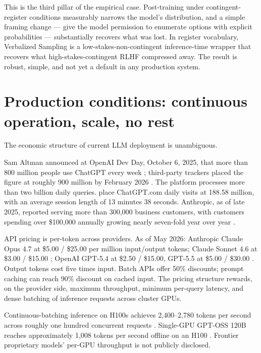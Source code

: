 \documentclass[11pt]{article}
\begin{document}
This is the third pillar of the empirical case. Post-training under
contingent-register conditions measurably narrows the model's
distribution, and a simple framing change --- give the model permission
to enumerate options with explicit probabilities --- substantially
recovers what was lost. In register vocabulary, Verbalized Sampling is
a low-stakes-non-contingent inference-time wrapper that recovers what
high-stakes-contingent RLHF compressed away. The result is robust,
simple, and not yet a default in any production system.

\section{Production conditions: continuous operation, scale, no rest}

The economic structure of current LLM deployment is unambiguous.

Sam Altman announced at OpenAI Dev Day, October 6, 2025, that more
than 800 million people use ChatGPT every week
\cite{techcrunch2025_800m}; third-party trackers placed the figure at
roughly 900 million by February 2026 \cite{demandsage2026_chatgpt}.
The platform processes more than two billion daily queries.
\cite{digitalinfoworld2025_chatgpt} place ChatGPT.com daily visits at
188.58 million, with an average session length of 13 minutes 38
seconds. Anthropic, as of late 2025, reported serving more than
300{,}000 business customers, with customers spending over
\$100{,}000 annually growing nearly seven-fold year over year
\cite{anthropic2025_business}.

API pricing is per-token across providers. As of May 2026: Anthropic
Claude Opus 4.7 at \$5.00 / \$25.00 per million input/output tokens;
Claude Sonnet 4.6 at \$3.00 / \$15.00 \cite{cloudzero2026_claude};
OpenAI GPT-5.4 at \$2.50 / \$15.00, GPT-5.5 at \$5.00 / \$30.00
\cite{finout2026_openai}. Output tokens cost five times input. Batch
APIs offer 50\% discounts; prompt caching can reach 90\% discount on
cached input. The pricing structure rewards, on the provider side,
maximum throughput, minimum per-query latency, and dense batching of
inference requests across cluster GPUs.

Continuous-batching inference on H100s achieves
2{,}400--2{,}780 tokens per second across roughly one hundred
concurrent requests \cite{morphllm2026_tps}. Single-GPU GPT-OSS 120B
reaches approximately 1{,}008 tokens per second offline on an H100
\cite{byteplus2025_throughput}. Frontier proprietary models' per-GPU
throughput is not publicly disclosed.
\end{document}
